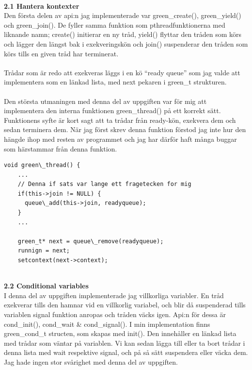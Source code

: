 \documentclass[a4paper,10pt]{article}
\begin{document}
\maketitle
\textbf
{\\2.1 Hantera kontexter\\}
Den första delen av api:n jag implementerade var green\_create(), green\_yield() och green\_join(). De fyller samma funktion som pthreadfunktionerna med liknande namn; create() initierar en ny tråd, yield() flyttar den tråden som körs och lägger den längst bak i exekveringskön och join() suspenderar den tråden som körs tills en given tråd har terminerat.\\\\
Trådar som  är redo att exekveras läggs i en kö ``ready queue'' som jag valde att implementera som en länkad lista, med next pekaren i green\_t strukturen. \\\\
Den största utmaningen med denna del av uppgiften var för mig att implementera den interna funktionen green\_thread() på ett korrekt sätt. Funktionens syfte är kort sagt att ta trådar från ready-kön, exekvera dem och sedan terminera dem. När jag först skrev denna funktion förstod jag inte hur den hängde ihop med resten av programmet och jag har därför haft många buggar som härstammar från denna funktion.

\begin{lstlisting}[style=CStyle]
  void green\_thread() {
    ...
    // Denna if sats var lange ett fragetecken for mig
    if(this->join != NULL) {
      queue\_add(this->join, readyqueue);
    }
    ...
    
    green_t* next = queue\_remove(readyqueue);
    runnign = next;
    setcontext(next->context);

\end{lstlisting}


\maketitle
\textbf
{\\2.2 Conditional variables\\}
I denna del av uppgiften implementerade jag villkorliga variabler. En tråd exekverar tills den hamnar vid en villkorlig variabel, och blir då suspenderad tills variablen signal funktion anropas och tråden väcks igen. Api:n för dessa är cond\_init(), cond\_wait \& cond\_signal(). I min implementation finns green\_cond\_t structen, som skapas med init(). Den innehåller en länkad lista med trådar som väntar på variablen. Vi kan sedan lägga till eller ta bort trådar i denna lista med wait respektive signal, och på så sätt suspendera eller väcka dem. Jag hade ingen stor svårighet med denna del av uppgiften.
\end{document}

